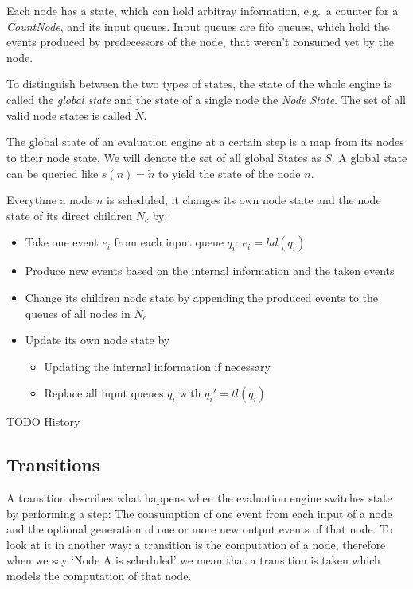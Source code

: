 Each node has a state, which can hold arbitray information, e.g.\ a counter for a \emph{CountNode}, and its input queues.
Input queues are \gls{fifo} queues, which hold the events produced by predecessors of the node, that weren't consumed yet by the node.

To distinguish between the two types of states, the state of the whole engine is called the \emph{global state} and the state of a single node the \emph{Node State}.
The set of all valid node states is called \(\widetilde{N}\).

The global state of an evaluation engine at a certain step is a map from its nodes to their node state.
We will denote the set of all global States as \(S\).
A global state can be queried like \(s(n) = \widetilde{n}\) to yield the state of the node \(n\).

Everytime a node \(n\) is scheduled, it changes its own node state and the node state of its direct children \(N_c\) by:

\begin{itemize}
  \item Take one event \(e_i\) from each input queue \(q_i\): \(e_i = hd(q_i)\)
  \item Produce new events based on the internal information and the taken events
  \item Change its children node state by appending the produced events to the queues of all nodes in \(N_c\)
  \item Update its own node state by
  \begin{itemize}
    \item Updating the internal information if necessary
    \item Replace all input queues \(q_i\) with \(q_i' = tl(q_i)\)
  \end{itemize}
\end{itemize}

TODO History

\subsection{Transitions}
\label{sec:concepts:def:transitions}

A transition describes what happens when the evaluation engine switches state by performing a step:
The consumption of one event from each input of a node and the optional generation of one or more new output events of that node.
To look at it in another way: a transition is the computation of a node, therefore when we say `Node A is scheduled' we mean that a transition is taken which models the computation of that node.

